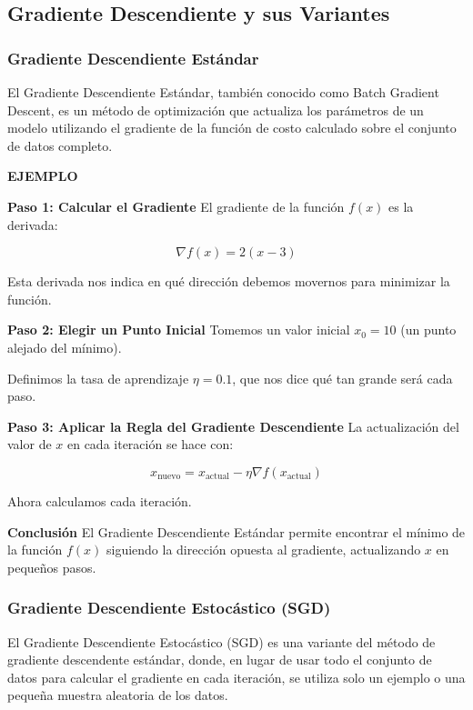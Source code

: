 \documentclass{article}
\begin{document}
	\subsection{Gradiente Descendiente y sus Variantes}
	
	\subsubsection{Gradiente Descendiente Estándar}
	
	El Gradiente Descendiente Estándar, también conocido como Batch Gradient Descent, es un método de optimización que actualiza los parámetros de un modelo utilizando el gradiente de la función de costo calculado sobre el conjunto de datos completo.
	
	\textbf{EJEMPLO}
	
	\textbf{Paso 1: Calcular el Gradiente}
	El gradiente de la función \( f(x) \) es la derivada:
	
	\[
	\nabla f(x) = 2(x - 3)
	\]
	
	Esta derivada nos indica en qué dirección debemos movernos para minimizar la función.
	
	\textbf{Paso 2: Elegir un Punto Inicial}
	Tomemos un valor inicial \( x_0 = 10 \) (un punto alejado del mínimo).
	
	Definimos la tasa de aprendizaje \( \eta = 0.1 \), que nos dice qué tan grande será cada paso.
	
	\textbf{Paso 3: Aplicar la Regla del Gradiente Descendiente}
	La actualización del valor de \( x \) en cada iteración se hace con:
	
	\[
	x_{\text{nuevo}} = x_{\text{actual}} - \eta \nabla f(x_{\text{actual}})
	\]
	
	Ahora calculamos cada iteración.
	
	\textbf{Conclusión}
	El Gradiente Descendiente Estándar permite encontrar el mínimo de la función \( f(x) \) siguiendo la dirección opuesta al gradiente, actualizando \( x \) en pequeños pasos.
	
	\subsubsection{Gradiente Descendiente Estocástico (SGD)}
	
	El Gradiente Descendiente Estocástico (SGD) es una variante del método de gradiente descendente estándar, donde, en lugar de usar todo el conjunto de datos para calcular el gradiente en cada iteración, se utiliza solo un ejemplo o una pequeña muestra aleatoria de los datos.
	
\end{document}
